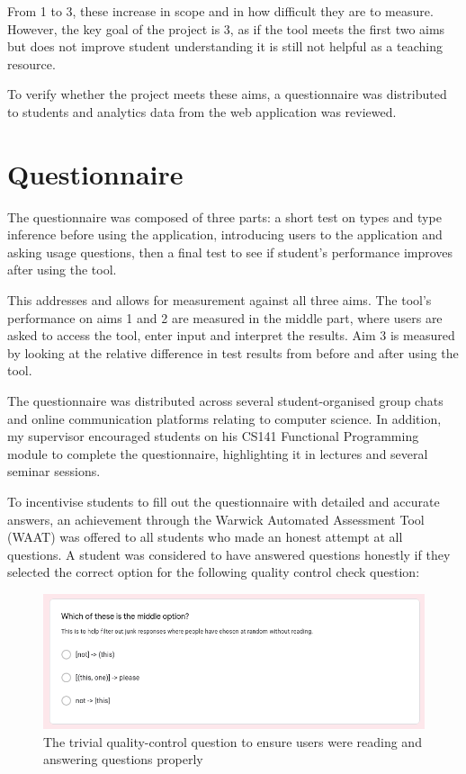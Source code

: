 \documentclass[a4paper,fleqn,twoside,12pt]{report}
\begin{document}
From 1 to 3, these increase in scope and in how difficult they are to measure. However, the key goal of the project is 3, as if the tool meets the first two aims but does not improve student understanding it is still not helpful as a teaching resource.

To verify whether the project meets these aims, a questionnaire was distributed to students and analytics data from the web application was reviewed.
\section{Questionnaire}\label{id:h.yqiowsgjmohq}
The questionnaire was composed of three parts: a short test on types and type inference before using the application, introducing users to the application and asking usage questions, then a final test to see if student’s performance improves after using the tool.

This addresses and allows for measurement against all three aims. The tool’s performance on aims 1 and 2 are measured in the middle part, where users are asked to access the tool, enter input and interpret the results. Aim 3 is measured by looking at the relative difference in test results from before and after using the tool.

The questionnaire was distributed across several student-organised group chats and online communication platforms relating to computer science. In addition, my supervisor encouraged students on his CS141 Functional Programming module to complete the questionnaire, highlighting it in lectures and several seminar sessions.

To incentivise students to fill out the questionnaire with detailed and accurate answers, an achievement through the Warwick Automated Assessment Tool (WAAT) was offered to all students who made an honest attempt at all questions. A student was considered to have answered questions honestly if they selected the correct option for the following quality control check question:

{\centering \begin{figure}[h!]
  \centering
  \includegraphics[width=0.882\linewidth]{images/image32.png}
  \caption{The trivial quality-control question to ensure users were reading and answering questions properly}
\end{figure} \par}
\end{document}
